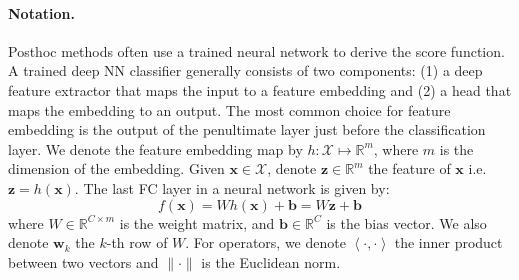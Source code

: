 \documentclass[nohyperref]{article}
\theoremstyle{plain}
\theoremstyle{definition}
\theoremstyle{remark}
\begin{document}
\paragraph{Notation.}
Posthoc methods often use a trained neural network to derive the score function.
A trained deep NN classifier generally consists of two components: 
(1) a deep feature extractor that maps the input to a feature embedding and 
(2) a head that maps the embedding to an output.
The most common choice for feature embedding is the output of the penultimate layer just before the classification layer. 
We denote the feature embedding map by $h: \mathcal{X} \mapsto \mathbb{R}^{m}$, where 
$m$ is the dimension of the embedding. 
Given $\mathbf{x} \in \mathcal{X}$, denote $\mathbf{z} \in \mathbb{R}^{m}$ the feature of $\mathbf{x}$ i.e. $\mathbf{z} = h(\mathbf{x})$.
The last FC layer in a neural network is given by:
\begin{equation}
    f(\mathbf{x}) = W h(\mathbf{x}) + \mathbf{b} = W \mathbf{z} + \mathbf{b}
\end{equation}
where $W \in \mathbb{R}^{C \times m}$ is the weight matrix, and $\mathbf{b} \in \mathbb{R}^{C}$ is the bias vector.
We also denote $\mathbf{w}_k$ the $k$-th row of $W$.
For operators, we denote $\left<\cdot, \cdot \right>$ the inner product between two vectors and $\|\cdot \|$ is the Euclidean norm. 
\end{document}
